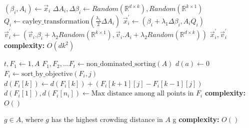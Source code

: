 \begin{algorithm}[H]
\caption{$\text{mutate}[\vec{\lambda}](\vec{x}_i,\vec{v}_i)$}
\label{mopso:mutate}
\begin{algorithmic}[1]
\State $(\beta_i, A_i)\gets \vec{x}_i$
\State $\Delta A_i, \Delta \beta_i \gets Random(\mathbb{R}^{d\times k}),Random(\mathbb{R}^{k\times 1})$
\State $Q_i \gets \text{cayley\_transformation}(\frac{\lambda_1}{2} \Delta A_i)$
\State $\vec{x}^{'}_i\gets (\beta_i + \lambda_1 \Delta \beta_i, A_iQ_i)$
\State $\vec{v}^{'}_i \gets (\vec{v}_i.\beta_i + \lambda_2 Random(\mathbb{R}^{k\times 1}), \vec{v}_i.A_i + \lambda_2 Random(\mathbb{R}^{d\times k}))$
\State \Return $\vec{x}^{'}_i, \vec{v}^{'}_i$
\State \textbf{complexity: } $O(dk^2)$
\end{algorithmic}
\end{algorithm}

\begin{algorithm}[H]
\caption{$\text{crowding\_distance}[Case](A)$}
\label{mopso:crowding_distance}
\begin{algorithmic}[1]
 
\State $t,F_1 \gets 1, A$
\EndIf
{} 
\State $F_1,F_2,...F_t \gets \text{non\_dominated\_sorting}(A)$
\EndIf
{}
        \State $d(a) \gets 0$
    \EndFor
     
        \State $F_i \gets \text{sort\_by\_objective}(F_i,j)$ 
         
            \State $d(F_i[k]) \gets d(F_i[k]) + (F_i[k+1][j] - F_i[k-1][j])$
        \EndFor
    \EndFor
    \State $d(F_i[1]), d(F_i[n_i])  \gets \text{Max distance among all points in } F_i $
\EndFor
\State \textbf{complexity: } $O()$
\end{algorithmic}
\end{algorithm}

\begin{algorithm}[H]
\caption{$\text{get\_global\_best}(A)$}
\label{mopso:get_global_best}
\begin{algorithmic}[1]
\State $g \in A$, where $g$ has the highest crowding distance in $A$
\State \Return g
\State \textbf{complexity: } $O()$
\end{algorithmic}
\end{algorithm}

